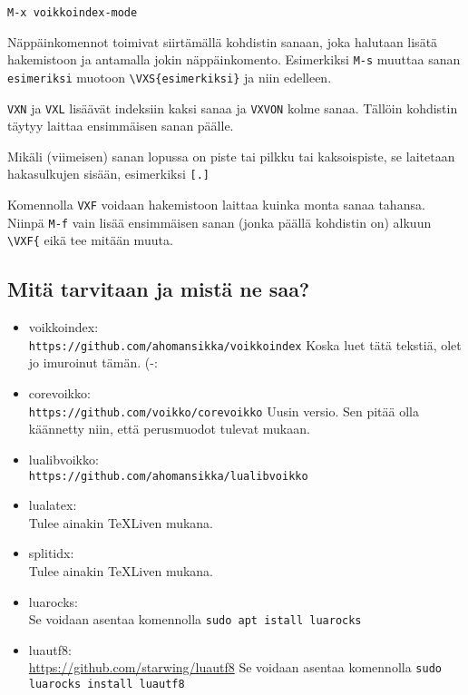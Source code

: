 \documentclass[12pt]{article}
\begin{document}
\verb=M-x voikkoindex-mode=

Näppäinkomennot toimivat siirtämällä kohdistin sanaan, joka halutaan
lisätä hakemistoon ja antamalla jokin näppäinkomento. Esimerkiksi
\verb=M-s= muuttaa sanan \verb=esimeriksi= muotoon
\verb=\VXS{esimerkiksi}= ja niin edelleen.

\verb=VXN= ja \verb=VXL= lisäävät indeksiin kaksi sanaa ja
\verb=VXVON= kolme sanaa. Tällöin kohdistin täytyy laittaa ensimmäisen
sanan päälle.

Mikäli (viimeisen) sanan lopussa on piste tai pilkku tai kaksoispiste,
se laitetaan hakasulkujen sisään, esimerkiksi \verb=[.]=

Komennolla \verb=VXF= voidaan hakemistoon laittaa kuinka monta sanaa
tahansa. Niinpä \verb=M-f= vain lisää ensimmäisen sanan (jonka päällä
kohdistin on) alkuun \verb=\VXF{= eikä tee mitään muuta.


\newpage
\subsection*{Mitä tarvitaan ja mistä ne saa?}

\begin{itemize}
\item voikkoindex: \\
      \verb=https://github.com/ahomansikka/voikkoindex=
      Koska luet tätä tekstiä, olet jo imuroinut tämän. (-:

\item corevoikko: \\
      \verb=https://github.com/voikko/corevoikko=
      Uusin versio. Sen pitää olla käännetty niin, että perusmuodot
      tulevat mukaan.

\item lualibvoikko: \\
      \verb=https://github.com/ahomansikka/lualibvoikko=

\item lualatex: \\
      Tulee ainakin TeXLiven mukana.

\item splitidx: \\
      Tulee ainakin TeXLiven mukana.

\item luarocks: \\
      Se voidaan asentaa komennolla
      \verb=sudo apt istall luarocks=

\item luautf8: \\
      \url{https://github.com/starwing/luautf8}
      Se voidaan asentaa komennolla
      \verb=sudo luarocks install luautf8=
\end{itemize}
\end{document}
